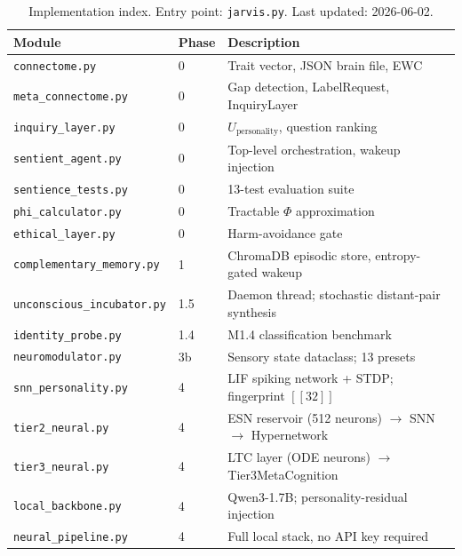 \documentclass[11pt,a4paper]{article}
\begin{document}
\begin{table}[h!]
\centering
\small
\begin{tabular}{lll}
\toprule
\textbf{Module} & \textbf{Phase} & \textbf{Description} \\
\midrule
\texttt{connectome.py}          & 0   & Trait vector, JSON brain file, EWC \\
\texttt{meta\_connectome.py}    & 0   & Gap detection, LabelRequest, InquiryLayer \\
\texttt{inquiry\_layer.py}      & 0   & $U_{\text{personality}}$, question ranking \\
\texttt{sentient\_agent.py}     & 0   & Top-level orchestration, wakeup injection \\
\texttt{sentience\_tests.py}    & 0   & 13-test evaluation suite \\
\texttt{phi\_calculator.py}     & 0   & Tractable $\Phi$ approximation \\
\texttt{ethical\_layer.py}      & 0   & Harm-avoidance gate \\
\texttt{complementary\_memory.py} & 1 & ChromaDB episodic store, entropy-gated wakeup \\
\texttt{unconscious\_incubator.py} & 1.5 & Daemon thread; stochastic distant-pair synthesis \\
\texttt{identity\_probe.py}     & 1.4 & M1.4 classification benchmark \\
\texttt{neuromodulator.py}      & 3b  & Sensory state dataclass; 13 presets \\
\texttt{snn\_personality.py}    & 4   & LIF spiking network + STDP; fingerprint $[\![32]\!]$ \\
\texttt{tier2\_neural.py}       & 4   & ESN reservoir (512 neurons) $\to$ SNN $\to$ Hypernetwork \\
\texttt{tier3\_neural.py}       & 4   & LTC layer (ODE neurons) $\to$ Tier3MetaCognition \\
\texttt{local\_backbone.py}     & 4   & Qwen3-1.7B; personality-residual injection \\
\texttt{neural\_pipeline.py}    & 4   & Full local stack, no API key required \\
\bottomrule
\end{tabular}
\caption{Implementation index. Entry point: \texttt{jarvis.py}.
Last updated: 2026-06-02.}
\end{table}
\end{document}
